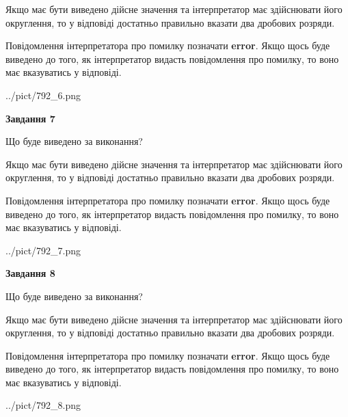 \documentclass[12pt, ukrainian]{article}
\begin{document}
{\begin {Large}
Якщо має бути виведено дійсне значення та інтерпретатор має здійснювати його округлення, 
то у відповіді достатньо правильно вказати два дробових розряди.

Повідомлення інтерпретатора про помилку позначати \textbf{error}.
Якщо щось буде виведено до того, як інтерпретатор видасть повідомлення про помилку, 
то воно має вказуватись у відповіді. \par

\begin{center}
	{../pict/792_6.png}
\end{center}
\newpage

{\begin {center}\textbf{Завдання 7}\end {center}}\par
Що буде виведено за виконання? \par

Якщо має бути виведено дійсне значення та інтерпретатор має здійснювати його округлення, 
то у відповіді достатньо правильно вказати два дробових розряди.

Повідомлення інтерпретатора про помилку позначати \textbf{error}.
Якщо щось буде виведено до того, як інтерпретатор видасть повідомлення про помилку, 
то воно має вказуватись у відповіді. \par

\begin{center}
	{../pict/792_7.png}
\end{center}
\newpage

{\begin {center}\textbf{Завдання 8}\end {center}}\par
Що буде виведено за виконання? \par

Якщо має бути виведено дійсне значення та інтерпретатор має здійснювати його округлення, 
то у відповіді достатньо правильно вказати два дробових розряди.

Повідомлення інтерпретатора про помилку позначати \textbf{error}.
Якщо щось буде виведено до того, як інтерпретатор видасть повідомлення про помилку, 
то воно має вказуватись у відповіді. \par

\begin{center}
	{../pict/792_8.png}
\end{center}
\newpage


\end{Large}}
\end{document}
